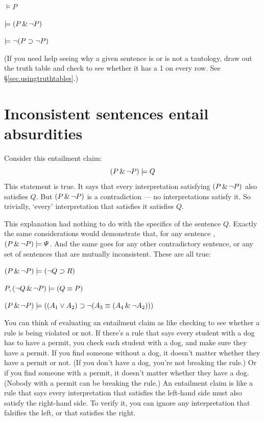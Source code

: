 \begin{earg}
\item[] $\models P$
\item[] $\models (P \,\&\, \neg P)$
\item[] $\models \neg(P \supset \neg P)$
\end{earg}

(If you need help seeing why a given sentence is or is not a tautology, draw out the truth table and check to see whether it has a 1 on every row. See \S\ref{sec.usingtruthtables}.)

\section{Inconsistent sentences entail absurdities}

Consider this entailment claim: $$(P \,\&\, \neg P) \models Q$$This statement is true. It says that every interpretation satisfying $(P \,\&\, \neg P)$ also satisfies $Q$. But $(P \,\&\, \neg P)$ is a contradiction --- no interpretations satisfy it. So trivially, `every' interpretation that satisfies it satisfies $Q$.

This explanation had nothing to do with the specifics of the sentence $Q$. Exactly the same considerations would demonstrate that, for any sentence \metaB{}, $(P \,\&\, \neg P) \models \varPsi{}$. And the same goes for any other contradictory sentence, or any set of sentences that are mutually inconsistent. These are all true:

\begin{earg}
\item[] $(P \,\&\, \neg P) \models (\neg Q \supset R)$
\item[] $P, (\neg Q \,\&\, \neg P) \models (Q \equiv P)$
\item[] $(P \,\&\,\neg P) \models ((A_1 \vee A_2) \supset \neg (A_3 \equiv (A_4 \,\&\, \neg A_2)))$
\end{earg}

You can think of evaluating an entailment claim as like checking to see whether a rule is being violated or not. If there's a rule that says every student with a dog has to have a permit, you check each student with a dog, and make sure they have a permit. If you find someone without a dog, it doesn't matter whether they have a permit or not. (If you don't have a dog, you're not breaking the rule.) Or if you find someone with a permit, it doesn't matter whether they have a dog. (Nobody with a permit can be breaking the rule.) An entailment claim is like a rule that says every interpretation that satisfies the left-hand side must also satisfy the right-hand side. To verify it, you can ignore any interpretation that falsifies the left, or that satisfies the right.

